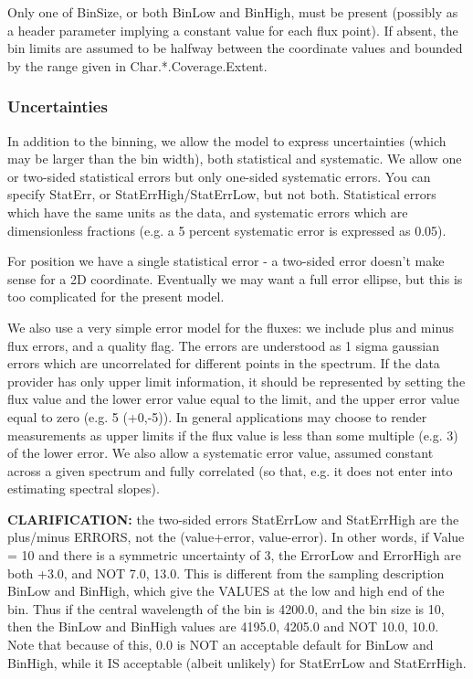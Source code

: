 \documentclass[11pt]{article}
\begin{document}
Only one of BinSize, or both
BinLow and BinHigh, must be present  (possibly as a header parameter
implying a constant value for each flux point). 
If absent, the bin limits are assumed to be halfway between the
coordinate values and bounded by the range given in Char.*.Coverage.Extent.

\subsubsection{Uncertainties}

In addition to the binning, we allow the model to express uncertainties
(which may be larger than the bin width), both statistical and systematic.
We allow one or two-sided statistical errors but only one-sided systematic errors.
You can specify StatErr, or StatErrHigh/StatErrLow, but not both.
Statistical errors which have the same units as
the data, and systematic errors which are dimensionless fractions
(e.g. a 5 percent systematic error is expressed as 0.05).


For position we have a single statistical error - a two-sided error
doesn't make sense for a 2D coordinate. Eventually we may want a full
error ellipse, but this is too complicated for the present model.
  
We also use a very simple error model for the fluxes: we include plus and minus flux
errors, and a quality flag. The errors are understood as
1 sigma gaussian errors which are uncorrelated for different points
in the spectrum. If the data provider has only upper limit
information, it should be represented by setting the flux value and
the lower error value equal to the limit, and the upper error value
equal to zero (e.g.  5 (+0,-5)). In general applications
may choose to render measurements as upper limits if the flux value
is less than some multiple (e.g. 3) of the lower error.
We also allow a systematic error value, assumed constant across
a given spectrum and fully correlated (so that, e.g. it does not enter
into estimating spectral slopes).


{\bf CLARIFICATION: }  the two-sided errors StatErrLow and StatErrHigh are the plus/minus ERRORS,
not the (value+error, value-error). In other words, if Value = 10 and there
is a symmetric uncertainty of 3, the ErrorLow and ErrorHigh are both +3.0,
and NOT 7.0, 13.0. This is different from the sampling description BinLow
and BinHigh, which give the VALUES at the low and high end of the bin. Thus
if the central wavelength of the bin is 4200.0, and the bin size is 10, then
the BinLow and BinHigh values are 4195.0, 4205.0 and NOT 10.0, 10.0. Note that
because of this, 0.0 is NOT an acceptable default for BinLow and BinHigh, while
it IS acceptable (albeit unlikely) for StatErrLow and StatErrHigh.
  
\end{document}
